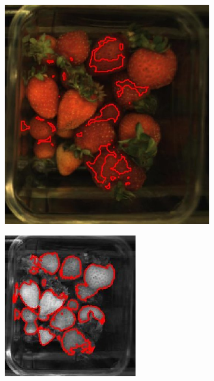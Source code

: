 \documentclass[conference]{IEEEtran}
\begin{document}
\begin{figure}[ht]
	\begin{subfigure}{.25\textwidth}
		\centering
		\includegraphics[width=.9\linewidth]{eps/over_diff_hue.eps}
		\caption{}
		\label{fig:over_diff}
	\end{subfigure}%
	\begin{subfigure}{.25\textwidth}
		\centering
		\includegraphics[width=.9\linewidth]{eps/over_light.eps}
		\caption{}
		\label{fig:over_light}
	\end{subfigure}%
	

\end{figure}
\end{document}
